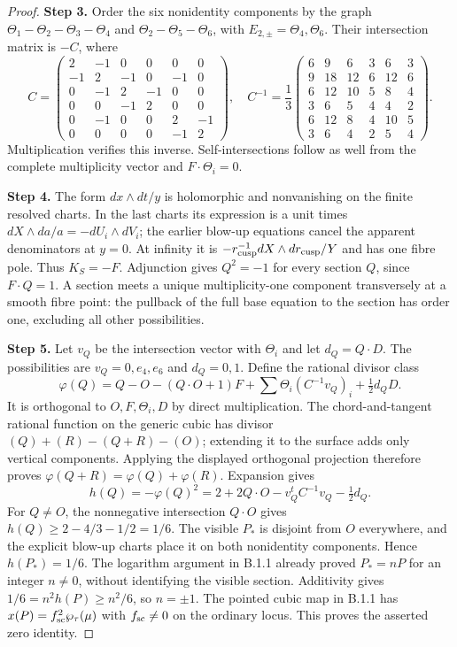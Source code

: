 \begin{proof}
\par\smallskip\noindent\textbf{Step 3.} Order the six nonidentity components by the graph
$\Theta_1-\Theta_2-\Theta_3-\Theta_4$ and $\Theta_2-\Theta_5-\Theta_6$, with $E_{2,\pm}=\Theta_4,\Theta_6$. Their intersection matrix is $-C$, where
\[
 C=\begin{pmatrix}2&-1&0&0&0&0\\-1&2&-1&0&-1&0\\0&-1&2&-1&0&0\\0&0&-1&2&0&0\\0&-1&0&0&2&-1\\0&0&0&0&-1&2\end{pmatrix},\quad
 C^{-1}=\frac13\begin{pmatrix}6&9&6&3&6&3\\9&18&12&6&12&6\\6&12&10&5&8&4\\3&6&5&4&4&2\\6&12&8&4&10&5\\3&6&4&2&5&4\end{pmatrix}.
\]
Multiplication verifies this inverse. Self-intersections follow as well from the complete multiplicity vector and $F\cdot\Theta_i=0$.

\par\smallskip\noindent\textbf{Step 4.} The form $dx\wedge dt/y$ is holomorphic and nonvanishing on the finite resolved charts. In the last charts its expression is a unit times $dX\wedge da/a=-dU_i\wedge dV_i$; the earlier blow-up equations cancel the apparent denominators at $y=0$. At infinity it is $-r_{\rm cusp}^{-1}dX\wedge d r_{\rm cusp}/Y$ and has one fibre pole. Thus $K_S=-F$. Adjunction gives $Q^2=-1$ for every section $Q$, since $F\cdot Q=1$. A section meets a unique multiplicity-one component transversely at a smooth fibre point: the pullback of the full base equation to the section has order one, excluding all other possibilities.

\par\smallskip\noindent\textbf{Step 5.} Let $v_Q$ be the intersection vector with $\Theta_i$ and let $d_Q=Q\cdot D$. The possibilities are $v_Q=0,e_4,e_6$ and $d_Q=0,1$. Define the rational divisor class
\[
 \varphi(Q)=Q-O-(Q\cdot O+1)F+\sum\Theta_i(C^{-1}v_Q)_i+\tfrac12d_QD.
\]
It is orthogonal to $O,F,\Theta_i,D$ by direct multiplication. The chord-and-tangent rational function on the generic cubic has divisor $(Q)+(R)-(Q+R)-(O)$; extending it to the surface adds only vertical components. Applying the displayed orthogonal projection therefore proves $\varphi(Q+R)=\varphi(Q)+\varphi(R)$. Expansion gives
\[
 h(Q)=-\varphi(Q)^2=2+2Q\cdot O-v_Q^tC^{-1}v_Q-\tfrac12d_Q.
\]
For $Q\ne O$, the nonnegative intersection $Q\cdot O$ gives $h(Q)\ge2-4/3-1/2=1/6$. The visible $P_*$ is disjoint from $O$ everywhere, and the explicit blow-up charts place it on both nonidentity components. Hence $h(P_*)=1/6$. The logarithm argument in B.1.1 already proved $P_*=nP$ for an integer $n\ne0$, without identifying the visible section. Additivity gives $1/6=n^2h(P)\ge n^2/6$, so $n=\pm1$. The pointed cubic map in B.1.1 has $x(P)=f_{\rm sc}^2\wp_\tau(\mu)$ with $f_{\rm sc}\ne0$ on the ordinary locus. This proves the asserted zero identity.
\end{proof}
